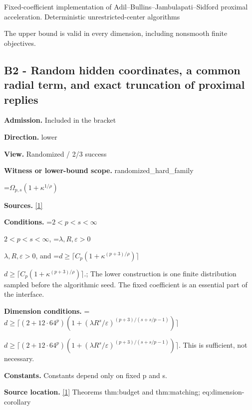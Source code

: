 \documentclass[10pt,a4paper]{article}
\newcommand{\AtlasMath}[1]{\par\begingroup\centering\setbox0=\hbox{$\displaystyle #1$}\ifdim\wd0>1.4\linewidth\typeout{ATLAS WIDE FORMULA: \the\wd0}\fi\ifdim\wd0>\linewidth\resizebox{\linewidth}{!}{\box0}\else\box0\fi\par\endgroup}
\newcommand{\AtlasInlineMath}[1]{\begingroup\setbox0=\hbox{$#1$}\ifdim\wd0>.4\linewidth\endgroup\AtlasMath{#1}\else\endgroup$#1$\fi}
\begin{document}
Fixed-coefficient implementation of Adil--Bullins--Jambulapati--Sidford proximal acceleration. Deterministic unrestricted-center algorithms



The upper bound is valid in every dimension, including nonsmooth finite objectives.



\subsection{B2 - Random hidden coordinates, a common radial term, and exact truncation of proximal replies}


\textbf{Admission.} Included in the bracket



\textbf{Direction.} lower



\textbf{View.} Randomized / 2/3 success



\textbf{Witness or lower-bound scope.} randomized\_hard\_family



\AtlasMath{\Omega_{p,s}(1+\kappa^{1/\rho})}


\textbf{Sources.} \href{https://github.com/WU-Wendao/Colombo/blob/main/colombo_sensorium/Complexity_altas/data/sources/colombo/B2/manuscript.pdf}{[1]}



\textbf{Conditions.} \AtlasInlineMath{2<p<s<\infty}, \AtlasInlineMath{\lambda,R,\varepsilon>0}, and \AtlasInlineMath{d\ge\lceil C_p(1+\kappa^{(p+3)/\rho})\rceil}.; The lower construction is one finite distribution sampled before the algorithmic seed. The fixed coefficient is an essential part of the interface.



\textbf{Dimension conditions.} \AtlasInlineMath{d\ge\lceil(2+12\cdot64^p)(1+(\lambda R^s/\varepsilon)^{(p+3)/(s+s/p-1)})\rceil}. This is sufficient, not necessary.



\textbf{Constants.} Constants depend only on fixed p and s.



\textbf{Source location.} \href{https://github.com/WU-Wendao/Colombo/blob/main/colombo_sensorium/Complexity_altas/data/sources/colombo/B2/manuscript.pdf}{[1]} Theorems thm:budget and thm:matching; eq:dimension-corollary
\end{document}
